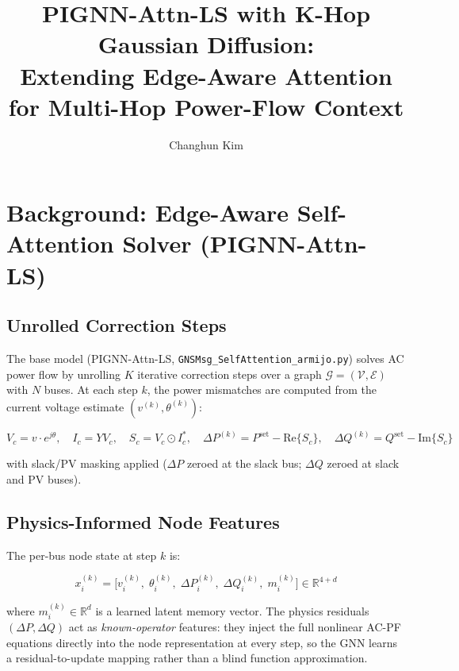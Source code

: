 \documentclass{article}
\title{PIGNN-Attn-LS with K-Hop Gaussian Diffusion:\\
  Extending Edge-Aware Attention for Multi-Hop Power-Flow Context}
\author{%
  Changhun Kim
}
\begin{document}
\maketitle

\section{Background: Edge-Aware Self-Attention Solver (PIGNN-Attn-LS)}

\subsection{Unrolled Correction Steps}

The base model (PIGNN-Attn-LS, \texttt{GNSMsg\_SelfAttention\_armijo.py})
solves AC power flow by unrolling $K$ iterative correction steps over a graph
$\mathcal{G} = (\mathcal{V}, \mathcal{E})$ with $N$ buses.
At each step $k$, the power mismatches are computed from the current voltage
estimate $(v^{(k)}, \theta^{(k)})$:

\begin{equation}
  V_c = v \cdot e^{j\theta}, \quad
  I_c = Y V_c, \quad
  S_c = V_c \odot I_c^*, \quad
  \Delta P^{(k)} = P^{\mathrm{set}} - \mathrm{Re}\{S_c\}, \quad
  \Delta Q^{(k)} = Q^{\mathrm{set}} - \mathrm{Im}\{S_c\}
\end{equation}

with slack/PV masking applied ($\Delta P$ zeroed at the slack bus;
$\Delta Q$ zeroed at slack and PV buses).

\subsection{Physics-Informed Node Features}

The per-bus node state at step $k$ is:

\begin{equation}
  x_i^{(k)}
  =
  \bigl[
    v_i^{(k)},\;
    \theta_i^{(k)},\;
    \Delta P_i^{(k)},\;
    \Delta Q_i^{(k)},\;
    m_i^{(k)}
  \bigr]
  \in \mathbb{R}^{4+d}
\end{equation}

where $m_i^{(k)} \in \mathbb{R}^d$ is a learned latent memory vector.
The physics residuals $(\Delta P, \Delta Q)$ act as \emph{known-operator}
features: they inject the full nonlinear AC-PF equations directly into the
node representation at every step, so the GNN learns a residual-to-update
mapping rather than a blind function approximation.
\end{document}
